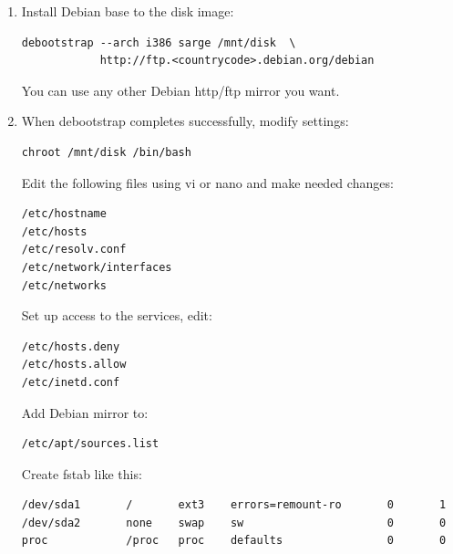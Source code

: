 \documentclass[11pt,twoside,final,openright]{report}
\begin{document}
{\begin{enumerate}
Make sure you have debootstrap installed on the host.  If you are
running Debian sarge (3.1 / testing) or unstable you can install it by
running .  Otherwise, it can be
downloaded from the Debian project website.

\item Install Debian base to the disk image:
\begin{small}\begin{verbatim}
debootstrap --arch i386 sarge /mnt/disk  \
            http://ftp.<countrycode>.debian.org/debian
\end{verbatim}\end{small}

You can use any other Debian http/ftp mirror you want.

\item When debootstrap completes successfully, modify settings:
\begin{small}\begin{verbatim}
chroot /mnt/disk /bin/bash
\end{verbatim}\end{small}

Edit the following files using vi or nano and make needed changes:
\begin{small}\begin{verbatim}
/etc/hostname
/etc/hosts
/etc/resolv.conf
/etc/network/interfaces
/etc/networks
\end{verbatim}\end{small}

Set up access to the services, edit:
\begin{small}\begin{verbatim}
/etc/hosts.deny
/etc/hosts.allow
/etc/inetd.conf
\end{verbatim}\end{small}

Add Debian mirror to:   
\begin{small}\begin{verbatim}
/etc/apt/sources.list
\end{verbatim}\end{small}

Create fstab like this:
\begin{small}\begin{verbatim}
/dev/sda1       /       ext3    errors=remount-ro       0       1
/dev/sda2       none    swap    sw                      0       0
proc            /proc   proc    defaults                0       0
\end{verbatim}\end{small}


\end{enumerate}}
\end{document}
